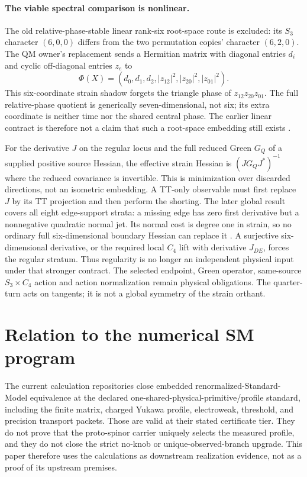\documentclass[11pt]{article}
\begin{document}
\paragraph{The viable spectral comparison is nonlinear.}
\label{sec:consumer-strain}
The old relative-phase-stable linear rank-six root-space route is excluded:
its $S_3$ character $(6,0,0)$ differs from the two permutation copies'
character $(6,2,0)$. The QM owner's replacement sends a Hermitian matrix with
diagonal entries $d_i$ and cyclic off-diagonal entries $z_e$ to
\[
 \Phi(X)=(d_0,d_1,d_2,|z_{12}|^2,|z_{20}|^2,|z_{01}|^2).
\]
This six-coordinate strain shadow forgets the triangle phase of
$z_{12}z_{20}z_{01}$. The full relative-phase quotient is generically
seven-dimensional, not six; its extra coordinate is neither time nor the
shared central phase. The earlier linear contract is therefore not a claim
that such a root-space embedding still exists \cite{FrozenStrain}.

For the derivative $J$ on the regular locus and the full reduced Green
$G_Q$ of a supplied positive source Hessian, the effective strain Hessian is
$(JG_QJ^*)^{-1}$ where the reduced covariance is invertible.
This is minimization over discarded directions, not an
isometric embedding. A TT-only observable must first replace $J$ by its TT
projection and then perform the shorting. The later global result covers all
eight edge-support strata: a missing edge has zero first derivative but a
nonnegative quadratic normal jet. Its normal cost is degree one in strain,
so no ordinary full six-dimensional boundary Hessian can replace it
\cite{FrozenSupport}. A surjective six-dimensional derivative, or the required
local $C_4$ lift with derivative $J_{DE}$, forces the regular stratum. Thus
regularity is no longer an independent physical input under that stronger
contract. The selected endpoint, Green operator, same-source $S_3\times C_4$
action and action normalization remain physical obligations. The quarter-turn
acts on tangents; it is not a global symmetry of the strain orthant.

\section{Relation to the numerical SM program}

The current calculation repositories close embedded renormalized-Standard-
Model equivalence at the declared one-shared-physical-primitive/profile
standard, including the finite matrix, charged Yukawa profile, electroweak,
threshold, and precision transport packets.  Those are valid at their stated
certificate tier.  They do not prove that the proto-spinor carrier uniquely
selects the measured profile, and they do not close the strict no-knob or
unique-observed-branch upgrade.  This paper therefore uses the calculations as
downstream realization evidence, not as a proof of its upstream premises.
\end{document}
